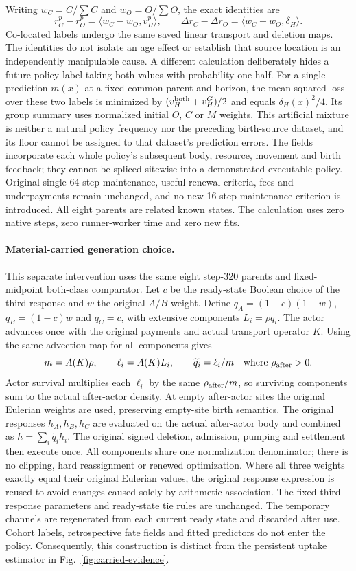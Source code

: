 Writing $w_C=C/\sum C$ and $w_O=O/\sum O$, the exact identities are
\[
r_C^p-r_O^p=\langle w_C-w_O,v_H^p\rangle,\qquad
\Delta r_C-\Delta r_O=\langle w_C-w_O,\delta_H\rangle.
\]
Co-located labels undergo the same saved linear transport and deletion maps. The identities do not isolate an age effect or establish that source location is an independently manipulable cause. A different calculation deliberately hides a future-policy label taking both values with probability one half. For a single prediction $m(x)$ at a fixed common parent and horizon, the mean squared loss over these two labels is minimized by $(v_H^{\rm both}+v_H^G)/2$ and equals $\delta_H(x)^2/4$. Its group summary uses normalized initial $O$, $C$ or $M$ weights. This artificial mixture is neither a natural policy frequency nor the preceding birth-source dataset, and its floor cannot be assigned to that dataset's prediction errors. The fields incorporate each whole policy's subsequent body, resource, movement and birth feedback; they cannot be spliced sitewise into a demonstrated executable policy. Original single-64-step maintenance, useful-renewal criteria, fees and underpayments remain unchanged, and no new 16-step maintenance criterion is introduced. All eight parents are related known states. The calculation uses zero native steps, zero runner-worker time and zero new fits.

\paragraph{Material-carried generation choice.}This separate intervention uses the same eight step-320 parents and fixed-midpoint both-class comparator. Let $c$ be the ready-state Boolean choice of the third response and $w$ the original $A/B$ weight. Define $q_A=(1-c)(1-w)$, $q_B=(1-c)w$ and $q_C=c$, with extensive components $L_i=\rho q_i$. The actor advances once with the original payments and actual transport operator $K$. Using the same advection map for all components gives
\[
m=A(K)\rho,\qquad \ell_i=A(K)L_i,\qquad
\widetilde q_i=\ell_i/m\quad\text{where }\rho_{\rm after}>0.
\]
Actor survival multiplies each $\ell_i$ by the same $\rho_{\rm after}/m$, so surviving components sum to the actual after-actor density. At empty after-actor sites the original Eulerian weights are used, preserving empty-site birth semantics. The original responses $h_A,h_B,h_C$ are evaluated on the actual after-actor body and combined as $h=\sum_i\widetilde q_i h_i$. The original signed deletion, admission, pumping and settlement then execute once. All components share one normalization denominator; there is no clipping, hard reassignment or renewed optimization. Where all three weights exactly equal their original Eulerian values, the original response expression is reused to avoid changes caused solely by arithmetic association. The fixed third-response parameters and ready-state tie rules are unchanged. The temporary channels are regenerated from each current ready state and discarded after use. Cohort labels, retrospective fate fields and fitted predictors do not enter the policy. Consequently, this construction is distinct from the persistent uptake estimator in Fig.~\ref{fig:carried-evidence}.

